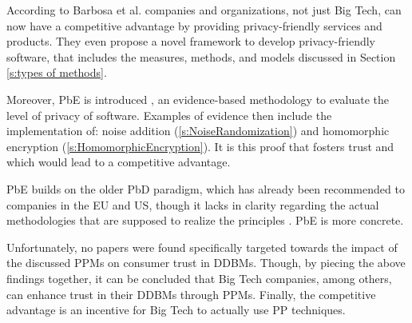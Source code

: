 According to Barbosa et al. \cite{Barbosa2020} companies and organizations, not just Big Tech,
can now have a competitive advantage by providing privacy-friendly services and products.
They even propose a novel framework to develop privacy-friendly software, 
that includes the measures, methods, and models discussed in Section \ref{s:types of methods}.

Moreover, \gls{PbE} is introduced \cite{Barbosa2020}, an evidence-based methodology to evaluate the level of privacy of software.
Examples of evidence then include the implementation of: 
noise addition (\ref{s:NoiseRandomization}) and homomorphic encryption (\ref{s:HomomorphicEncryption}).
It is this proof that fosters trust and which would lead to a competitive advantage.

\gls{PbE} builds on the older \gls{PbD} paradigm, which has already been recommended to companies in the EU and US, though it lacks in clarity regarding the actual methodologies that are supposed to realize the principles \cite{Monreale2014}.
\gls{PbE} is more concrete.

Unfortunately, no papers were found specifically targeted towards the impact of the discussed \gls{PPM}s on consumer trust in \gls{DDBM}s.
Though, by piecing the above findings together, it can be concluded that Big Tech companies, among others, can enhance trust in their \gls{DDBM}s through \gls{PPM}s.
Finally, the competitive advantage is an incentive for Big Tech to actually use \gls{PP} techniques.
